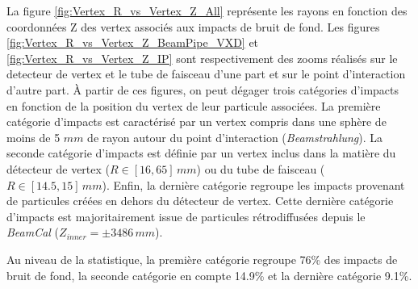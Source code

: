   La figure \ref{fig:Vertex_R_vs_Vertex_Z_All} repr\'esente les rayons en fonction des coordonn\'ees Z des vertex associ\'es aux impacts de bruit de fond. Les figures \ref{fig:Vertex_R_vs_Vertex_Z_BeamPipe_VXD} et \ref{fig:Vertex_R_vs_Vertex_Z_IP} sont respectivement des zooms r\'ealis\'es sur le detecteur de vertex et le tube de faisceau d'une part et sur le point d'interaction d'autre part. \`A partir de ces figures, on peut d\'egager trois cat\'egories d'impacts en fonction de la position du vertex de leur particule associ\'ees. La premi\`ere cat\'egorie d'impacts est caract\'eris\'e par un vertex compris dans une sph\`ere de moins de 5 $mm$ de rayon autour du point d'interaction (\textit{Beamstrahlung}). La seconde cat\'egorie d'impacts est d\'efinie par un vertex inclus dans la mati\`ere du d\'etecteur de vertex ($R \in [16,65] \, mm$) ou du tube de faisceau ($R \in [14.5,15] \, mm$). Enfin, la derni\`ere cat\'egorie regroupe les impacts provenant de particules cr\'e\'ees en dehors du d\'etecteur de vertex. Cette derni\`ere cat\'egorie d'impacts est majoritairement issue de particules r\'etrodiffus\'ees depuis le \textit{BeamCal} ($Z_{inner} = \pm 3486 \, mm$).
  
  \medskip

  Au niveau de la statistique, la premi\`ere cat\'egorie regroupe 76\% des impacts de bruit de fond, la seconde cat\'egorie en compte 14.9\% et la derni\`ere cat\'egorie 9.1\%.
    
